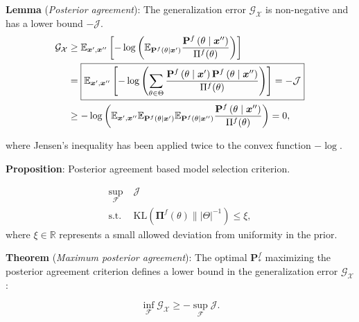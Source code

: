 \begin{frame}
	\textbf{Lemma} (\textit{Posterior agreement}): The generalization error $\mathcal{G}_{\mathcal{X}}$ is non-negative and has a lower bound $-\mathcal{J}$. 
	$$
	\begin{aligned}
		\mathcal{G}_{\mathcal{X}} & \geq \mathbb{E}_{\bm{x}', \bm{x}''}\left[-\log \left(\mathbb{E}_{\mathbf{P}^f( \theta \mid \bm{x}')} \frac{\mathbf{P}^{f}\left(\theta \mid \bm{x}''\right)}{\Pi^{f}(\theta)}\right)\right] \\
		& = \textcolor{black}{\boxed{\mathbb{E}_{\bm{x}', \bm{x}''} \left[-\log \left(\sum_{\theta \in \Theta} \frac{\mathbf{P}^{f}\left(\theta \mid \bm{x}'\right) \mathbf{P}^{f}\left(\theta \mid \bm{x}'' \right)}{\Pi^{f}(\theta)}\right)\right] = -\mathcal{J}}} \\
		& \geq-\log \left(\mathbb{E}_{\bm{x}', \bm{x}''} \mathbb{E}_{\mathbf{P}^f( \theta \mid \bm{x}')} \mathbb{E}_{\mathbf{P}^f(\theta \mid \bm{x}'')} \frac{\mathbf{P}^{f}\left(\theta \mid \bm{x}''\right)}{\Pi^{f}(\theta)}\right)=0,
	\end{aligned}
	$$
	
	where Jensen's inequality has been applied twice to the convex function $-\log$. \\
\end{frame}

\begin{frame}
	\textbf{Proposition}: Posterior agreement based model selection criterion.

    $$
    \begin{aligned}
        \sup_{\mathcal{F}} & \; \mathcal{J} \\
        \text{s.t.} & \; \text{KL}(\mathbf{\Pi}^f(\theta) \parallel |\Theta|^{-1}) \leq \xi,
    \end{aligned}
    $$
    where $\xi \in \mathbb{R}$ represents a small allowed deviation from uniformity in the prior.

	\vspace{0.5cm}

	\textbf{Theorem} (\textit{Maximum posterior agreement}): The optimal $\mathbf{P}_{*}^f$ maximizing the posterior 
	agreement criterion defines a lower bound in the generalization error $\mathcal{G}_{\mathcal{X}}$:
		
	$$
		\inf_{\mathcal{F}} \mathcal{G}_{\mathcal{X}} \geq -\sup_{\mathcal{F}} \mathcal{J}.
	$$
\end{frame}

